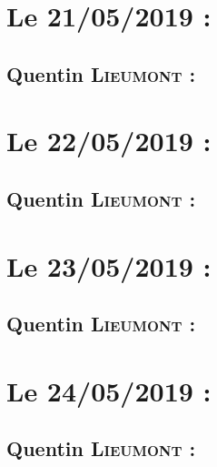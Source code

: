 \section{Le 21/05/2019 :}
    \subsection{Quentin \textsc{Lieumont} :}
        
\newpage
\section{Le 22/05/2019 :}
    \subsection{Quentin \textsc{Lieumont} :}
        
\newpage
\section{Le 23/05/2019 :}
    \subsection{Quentin \textsc{Lieumont} :}
        
\newpage
\section{Le 24/05/2019 :}
    \subsection{Quentin \textsc{Lieumont} :}
        
